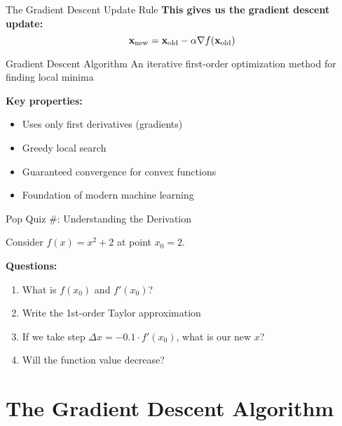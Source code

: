 \documentclass[usenames,dvipsnames]{beamer}
\begin{document}
  \begin{frame}{The Gradient Descent Update Rule}
    \textbf{This gives us the gradient descent update:}
    $$\mathbf{x}_{\text{new}} = \mathbf{x}_{\text{old}} - \alpha \nabla f(\mathbf{x}_{\text{old}})$$
    
    \pause
    \begin{definitionbox}{Gradient Descent Algorithm}
    An iterative first-order optimization method for finding local minima
    \end{definitionbox}
    
    \pause
    \textbf{Key properties:}
    \begin{itemize}[<+->]
        \item Uses only first derivatives (gradients)
        \item Greedy local search
        \item Guaranteed convergence for convex functions
        \item Foundation of modern machine learning
    \end{itemize}
  \end{frame}

  \begin{frame}{Pop Quiz \#\thepopquiz: Understanding the Derivation}
    \begin{popquizbox}{\thepopquiz}
    Consider $f(x) = x^2 + 2$ at point $x_0 = 2$.
    
    \textbf{Questions:}
    \begin{enumerate}
        \item What is $f(x_0)$ and $f'(x_0)$?
        \item Write the 1st-order Taylor approximation
        \item If we take step $\Delta x = -0.1 \cdot f'(x_0)$, what is our new $x$?
        \item Will the function value decrease?
    \end{enumerate}
    \end{popquizbox}
  \end{frame}

  \section{The Gradient Descent Algorithm}
\end{document}
